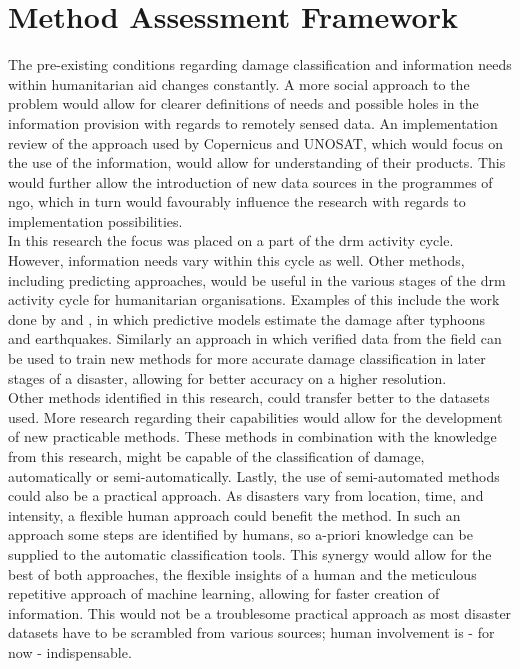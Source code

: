 \section{Method Assessment Framework}
The pre-existing conditions regarding damage classification and information needs within humanitarian aid changes constantly. A more social approach to the problem would allow for clearer definitions of needs and possible holes in the information provision with regards to remotely sensed data. An implementation review of the approach used by Copernicus and UNOSAT, which would focus on the use of the information, would allow for understanding of their products. This would further allow the introduction of new data sources in the programmes of \ac{ngo}, which in turn would favourably influence the research with regards to implementation possibilities. \\

\noindent In this research the focus was placed on a part of the \ac{drm} activity cycle. However, information needs vary within this cycle as well. Other methods, including predicting approaches, would be useful in the various stages of the \ac{drm} activity cycle for humanitarian organisations. Examples of this include the work done by \citet{Lint2016} and \cite{Bulte2017}, in which predictive models estimate the damage after typhoons and earthquakes. Similarly an approach in which verified data from the field can be used to train new methods for more accurate damage classification in later stages of a disaster, allowing for better accuracy on a higher resolution.\\

\noindent Other methods identified in this research, could transfer better to the datasets used. More research regarding their capabilities would allow for the development of new practicable methods. These methods in combination with the knowledge from this research, might be capable of the classification of damage, automatically or semi-automatically. Lastly, the use of semi-automated methods could also be a practical approach. As disasters vary from location, time, and intensity, a flexible human approach could benefit the method. In such an approach some steps are identified by humans, so a-priori knowledge can be supplied to the automatic classification tools. This synergy would allow for the best of both approaches, the flexible insights of a human and the meticulous repetitive approach of machine learning, allowing for faster creation of information. This would not be a troublesome practical approach as most disaster datasets have to be scrambled from various sources; human involvement is - for now - indispensable.

